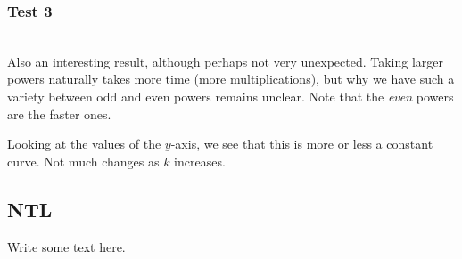 \documentclass[a4paper, titlepage]{article}
\begin{document}
\subsubsection{Test 3}
\vspace{4mm}
\begin{center}
\\
Also an interesting result, although perhaps not very unexpected. Taking larger powers naturally takes more time (more multiplications), but why we have such a variety between odd and even powers remains unclear. Note that the \emph{even} powers are the faster ones.\\
\vspace{4mm}
\end{center}
Looking at the values of the $y$-axis, we see that this is more or less a constant curve. Not much changes as $k$ increases.

\subsection{NTL}
Write some text here.
\end{document}
